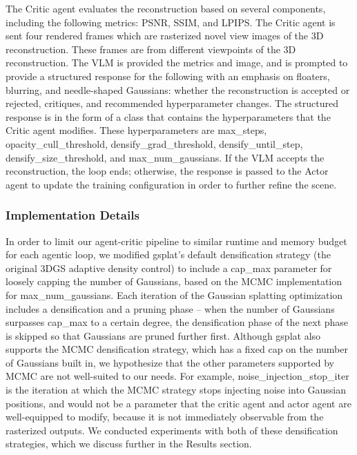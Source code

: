 \noindent The Critic agent evaluates the reconstruction based on several components, including the following metrics: PSNR, SSIM, and LPIPS. The Critic agent is sent four rendered frames which are rasterized novel view images of the 3D reconstruction. These frames are from different viewpoints of the 3D reconstruction. The VLM is provided the metrics and image, and is prompted to provide a structured response for the following with an emphasis on floaters, blurring, and needle-shaped Gaussians: whether the reconstruction is accepted or rejected, critiques, and recommended hyperparameter changes. The structured response is in the form of a class that contains the hyperparameters that the Critic agent modifies. These hyperparameters are max\_steps, opacity\_cull\_threshold, densify\_grad\_threshold, densify\_until\_step, densify\_size\_threshold, and max\_num\_gaussians. If the VLM accepts the reconstruction, the loop ends; otherwise, the response is passed to the Actor agent to update the training configuration in order to further refine the scene.

\subsubsection{Implementation Details}
\noindent In order to limit our agent-critic pipeline to similar runtime and memory budget for each agentic loop, we modified gsplat’s default densification strategy (the original 3DGS adaptive density control) to include a cap\_max parameter for loosely capping the number of Gaussians, based on the MCMC implementation for max\_num\_gaussians. Each iteration of the Gaussian splatting optimization includes a densification and a pruning phase – when the number of Gaussians surpasses cap\_max to a certain degree, the densification phase of the next phase is skipped so that Gaussians are pruned further first. Although gsplat also supports the MCMC densification strategy, which has a fixed cap on the number of Gaussians built in, we hypothesize that the other parameters supported by MCMC are not well-suited to our needs. For example, noise\_injection\_stop\_iter is the iteration at which the MCMC strategy stops injecting noise into Gaussian positions, and would not be a parameter that the critic agent and actor agent are well-equipped to modify, because it is not immediately observable from the rasterized outputs. We conducted experiments with both of these densification strategies, which we discuss further in the Results section.\\

